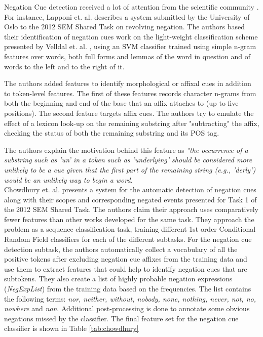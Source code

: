 
Negation Cue detection received a lot of attention from the scientific community \cite{story2020}. For instance, Lapponi et. al. \cite{lapponi2012uio} describes a system submitted by the University of Oslo to the 2012 SEM Shared Task on revolving negation. The authors based their identification of negation cues work on the light-weight classification scheme presented by Velldal et. al. \cite{velldal2012speculation}, using an SVM classifier trained using simple n-gram features over words, both full forms and lemmas of the word in question and of words to the left and to the right of it. 

The authors added features to identify morphological or affixal cues in addition to token-level features. The first of these features records character n-grams from both the beginning and end of the base that an affix attaches to (up to five positions). The second feature targets affix cues. The authors try to emulate the effect of a lexicon look-up on the remaining substring after "subtracting" the affix, checking the status of both the remaining substring and its POS tag. 

The authors explain the motivation behind this feature as \textit{"the occurrence of a substring such as 'un' in a token such as 'underlying' should be considered more unlikely to be a cue given that the first part of the remaining string (e.g., 'derly') would be an unlikely way to begin a word.} \\

Chowdhury et. al. \cite{chowdhury2012fbk} presents a system for the automatic detection of negation cues along with their scopes and corresponding negated events presented for Task 1 of the 2012 SEM Shared Task. The authors claim their approach uses comparatively fewer features than other works developed for the same task. They approach the problem as a sequence classification task, training different 1st order Conditional Random Field classifiers for each of the different subtasks. 
For the negation cue detection subtask, the authors automatically collect a vocabulary of all the positive tokens after excluding negation cue affixes from the training data and use them to extract features that could help to identify negation cues that are subtokens. They also create a list of highly probable negation expressions (\textit{NegExpList}) from the training data based on the frequencies. The list contains the following terms: \textit{nor, neither, without, nobody, none, nothing, never, not, no, nowhere} and  \textit{non}. Additional post-processing is done to annotate some obvious negations missed by the classifier. The final feature set for the negation cue classifier is shown in Table \ref{tab:chowdhury}

